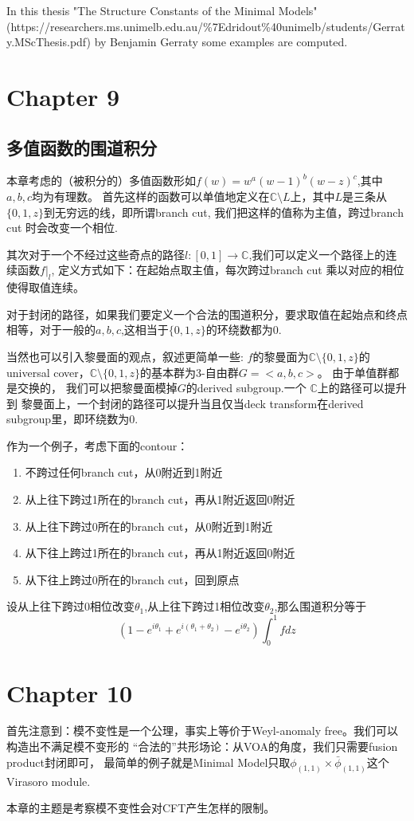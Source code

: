In this thesis "The Structure Constants of the Minimal Models" (https://researchers.ms.unimelb.edu.au/\%7Edridout\%40unimelb/students/Gerraty.MScThesis.pdf) by Benjamin Gerraty some examples are computed.
\section{Chapter 9}
\subsection{多值函数的围道积分}
本章考虑的（被积分的）多值函数形如$f(w)=w^a(w-1)^b(w-z)^c$,其中$a,b,c$均为有理数。
首先这样的函数可以单值地定义在$\mathbb{C}\setminus L$上，其中$L$是三条从$\{0,1,z\}$到无穷远的线，即所谓branch cut, 我们把这样的值称为主值，跨过branch cut
时会改变一个相位.

其次对于一个不经过这些奇点的路径$l:[0,1]\rightarrow \mathbb{C}$,我们可以定义一个路径上的连续函数$f|_{l}$, 定义方式如下：在起始点取主值，每次跨过branch cut
乘以对应的相位使得取值连续。

对于封闭的路径，如果我们要定义一个合法的围道积分，要求取值在起始点和终点相等，对于一般的$a,b,c$,这相当于$\{0,1,z\}$的环绕数都为$0$.

当然也可以引入黎曼面的观点，叙述更简单一些: $f$的黎曼面为$\mathbb{C}\setminus\{0,1,z\}$的 universal cover，$\mathbb{C}\setminus\{0,1,z\}$的基本群为3-自由群$G=<a,b,c>$。
由于单值群都是交换的， 我们可以把黎曼面模掉$G$的derived subgroup.一个 $\mathbb{C}$上的路径可以提升到
黎曼面上，一个封闭的路径可以提升当且仅当deck transform在derived subgroup里，即环绕数为0.

作为一个例子，考虑下面的contour：
\begin{enumerate}
    \item 不跨过任何branch cut，从0附近到1附近
    \item 从上往下跨过1所在的branch cut，再从1附近返回0附近
    \item 从上往下跨过0所在的branch cut，从0附近到1附近
    \item 从下往上跨过1所在的branch cut，再从1附近返回0附近
    \item 从下往上跨过0所在的branch cut，回到原点
\end{enumerate}
设从上往下跨过0相位改变$\theta_1$,从上往下跨过1相位改变$\theta_2$,那么围道积分等于
$$(1-e^{i\theta_1}+e^{i(\theta_1+{\theta_2})}-e^{i\theta_2})\int_{0}^{1}fdz$$
\section{Chapter 10}
首先注意到：模不变性是一个公理，事实上等价于Weyl-anomaly free。我们可以构造出不满足模不变形的
“合法的”共形场论：从VOA的角度，我们只需要fusion product封闭即可，
最简单的例子就是Minimal Model只取$\phi_{(1,1)}\times\bar\phi_{(1,1)}$这个Virasoro module.

本章的主题是考察模不变性会对CFT产生怎样的限制。
